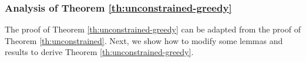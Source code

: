 \documentclass[10pt]{article} %
\theoremstyle{remark}
\newcommand{\OPT}{{\rm OPT}}
\begin{document}
\subsubsection{Analysis of Theorem \ref{th:unconstrained-greedy}}
The proof of Theorem \ref{th:unconstrained-greedy} can be adapted from the proof of Theorem \ref{th:unconstrained}. Next, we show how to modify some lemmas and results to derive Theorem \ref{th:unconstrained-greedy}.


\end{document}
